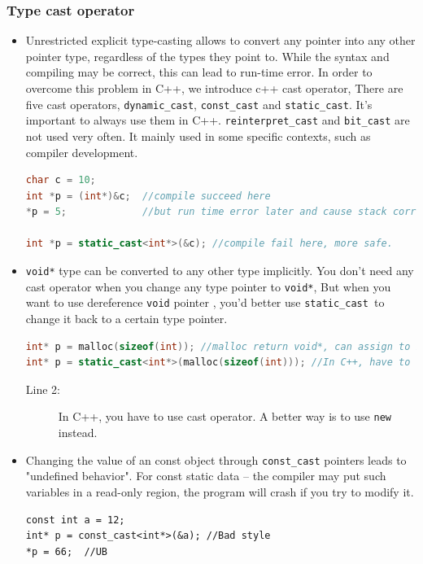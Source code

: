 \documentclass[a4paper,11pt,twoside]{book}
\begin{document}
\subsubsection{Type cast operator}
\begin{itemize}
	\item Unrestricted explicit type-casting allows to convert any pointer into any other pointer type, regardless of the types they point to. While the syntax and compiling may be correct, this can lead to run-time error. In order to overcome this problem in C++, we introduce c++ cast operator, There are five cast operators, \texttt{dynamic\_cast}, \texttt{const\_cast} and \texttt{static\_cast}. It's important to always use them in C++. \texttt{reinterpret\_cast} and \texttt{bit\_cast} are not used very often. It mainly used in some specific contexts, such as compiler development.
\begin{lstlisting}[frame=single, language=c++]
char c = 10;    
int *p = (int*)&c;  //compile succeed here
*p = 5;             //but run time error later and cause stack corruption.
	
int *p = static_cast<int*>(&c); //compile fail here, more safe. 
\end{lstlisting}
		
	\item \texttt{void*} type can be converted to any other type implicitly. You don't need any cast operator when you change any type pointer to \texttt{void*}, But when you want to use dereference \texttt{void} pointer , you'd better use \texttt{static\_cast }to change it back to a certain type pointer.
\begin{lstlisting}[frame=single, language=c++]
int* p = malloc(sizeof(int)); //malloc return void*, can assign to int* in C
int* p = static_cast<int*>(malloc(sizeof(int))); //In C++, have to use cast
\end{lstlisting}		
		\begin{description}
			\item[Line 2:] In C++, you have to use cast operator. A better way is to use \texttt{new} instead.
		\end{description}

	\item Changing the value of an const object through \texttt{const\_cast} pointers leads to  "undefined behavior". For const static data -- the compiler may put such variables in a read-only region, the program will crash if you try to modify it.

\begin{lstlisting}[numbers = none]
const int a = 12;
int* p = const_cast<int*>(&a); //Bad style
*p = 66;  //UB	
\end{lstlisting}



\end{itemize}
\end{document}
